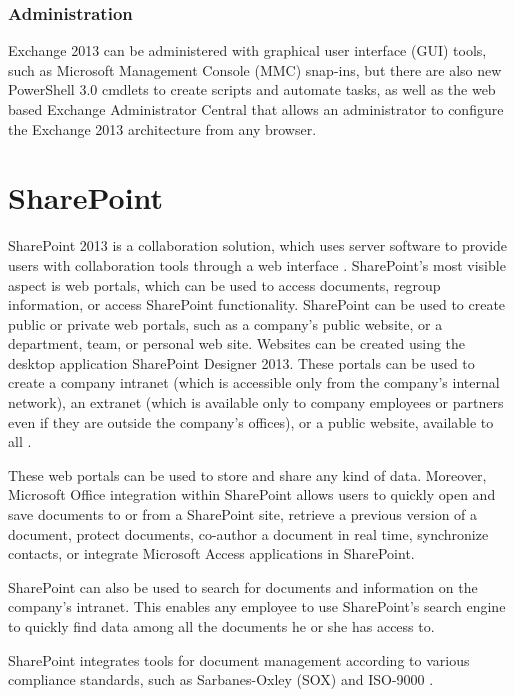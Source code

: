 \subsubsection{Administration}
Exchange 2013 can be administered with graphical user interface (GUI) tools, such as Microsoft Management Console (MMC) snap-ins, but there are also new PowerShell 3.0 cmdlets to create scripts and automate tasks, as well as the web based Exchange Administrator Central that allows an administrator to configure the Exchange 2013 architecture from any browser\cite[Ch. 3\&5]{redmond_microsoft_2010}.



\section{SharePoint}

SharePoint 2013 is a collaboration solution, which uses server software to provide users with collaboration tools through a web interface
\cite[Ch. 1]{husman_beginning_2010}.
SharePoint's most visible aspect is web portals, which can be used to access documents, regroup information, or access SharePoint functionality.
SharePoint can be used to create public or private web portals, such as a company's public website, or a department, team, or personal web site. Websites can be created using the desktop application SharePoint Designer 2013.
These portals can be used to create a company intranet (which is accessible only from the company's internal network), an extranet (which is available only to company employees or partners even if they are outside the company's offices), or a public website, available to all
\cite[Ch. 1]{husman_beginning_2010}.


These web portals can be used to store and share any kind of data. Moreover, Microsoft Office integration within SharePoint allows users to quickly open and save documents to or from a SharePoint site, retrieve a previous version of a document, protect documents, co-author a document in real time, synchronize contacts, or integrate Microsoft Access applications in SharePoint.

SharePoint can also be used to search for documents and information on the company's intranet. This enables any employee to use SharePoint's search engine to quickly find data among all the documents he or she has access to.

SharePoint integrates tools for document management according to various compliance standards, such as Sarbanes-Oxley (SOX) and ISO-9000
\cite[Ch. 1]{husman_beginning_2010}.




